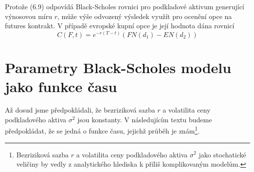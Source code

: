 \documentclass[a4paper]{book}
\begin{document}
Protože (6.9) odpovídá Black-Scholes rovnici pro podkladové aktivum generující výnosovou míru $r$, může výše odvozený výsledek využít pro ocenění opce na futures kontrakt. V případě evropské kupní opce je její hodnota dána rovnicí
\begin{equation*}
C(F,t) = e^{-r(T - t)}(FN(d_1) - EN(d_2))
\end{equation*}

\section{Parametry Black-Scholes modelu jako funkce času}

Až dosud jsme předpokládali, že bezriziková sazba $r$ a volatilita ceny podkladového aktiva $\sigma^2$ jsou konstanty. V následujícím textu budeme předpokládat, že se jedná o funkce času, jejichž průběh je znám\footnote{Bezriziková sazba $r$ a volatilita ceny podkladového aktiva $\sigma^2$ jako stochatické veličiny by vedly z analytického hlediska k příliš komplikovaným modelům.}.
\end{document}
